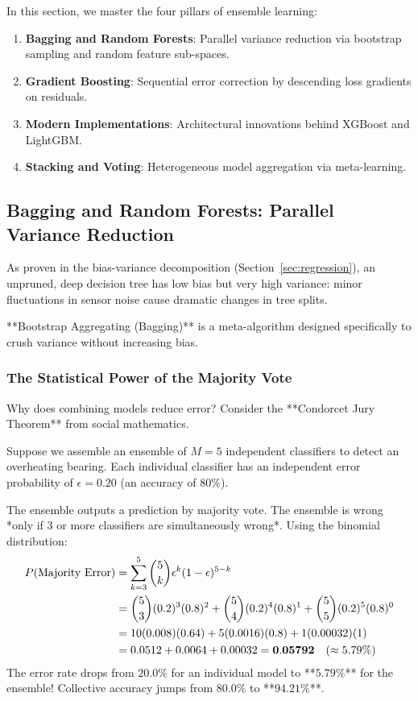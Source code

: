 In this section, we master the four pillars of ensemble learning:
\begin{enumerate}
    \item \textbf{Bagging and Random Forests}: Parallel variance reduction via bootstrap sampling and random feature sub-spaces.
    \item \textbf{Gradient Boosting}: Sequential error correction by descending loss gradients on residuals.
    \item \textbf{Modern Implementations}: Architectural innovations behind XGBoost and LightGBM.
    \item \textbf{Stacking and Voting}: Heterogeneous model aggregation via meta-learning.
\end{enumerate}

\subsection{Bagging and Random Forests: Parallel Variance Reduction}\label{subsec:bagging_random_forests}

As proven in the bias-variance decomposition (Section~\ref{sec:regression}), an unpruned, deep decision tree has low bias but very high variance: minor fluctuations in sensor noise cause dramatic changes in tree splits. 

**Bootstrap Aggregating (Bagging)** is a meta-algorithm designed specifically to crush variance without increasing bias.

\subsubsection{The Statistical Power of the Majority Vote}
Why does combining models reduce error? Consider the **Condorcet Jury Theorem** from social mathematics.

Suppose we assemble an ensemble of $M = 5$ independent classifiers to detect an overheating bearing. Each individual classifier has an independent error probability of $\epsilon = 0.20$ (an accuracy of $80\%$). 

The ensemble outputs a prediction by majority vote. The ensemble is wrong *only if 3 or more classifiers are simultaneously wrong*. Using the binomial distribution:
\begin{align}
P(\text{Majority Error}) &= \sum_{k=3}^{5} \binom{5}{k} \epsilon^k (1 - \epsilon)^{5 - k} \notag \\
&= \binom{5}{3} (0.2)^3 (0.8)^2 + \binom{5}{4} (0.2)^4 (0.8)^1 + \binom{5}{5} (0.2)^5 (0.8)^0 \notag \\
&= 10(0.008)(0.64) + 5(0.0016)(0.8) + 1(0.00032)(1) \notag \\
&= 0.0512 + 0.0064 + 0.00032 = \mathbf{0.05792} \quad (\approx 5.79\%)
\end{align}
The error rate drops from $20.0\%$ for an individual model to **$5.79\%$** for the ensemble! Collective accuracy jumps from $80.0\%$ to **$94.21\%$**.

